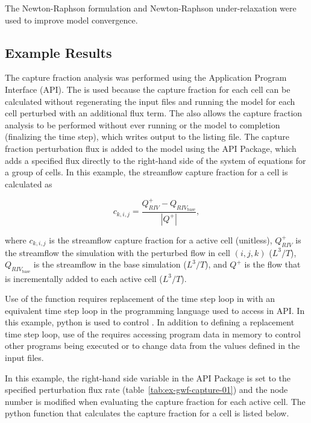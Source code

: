 The Newton-Raphson formulation and Newton-Raphson under-relaxation were used to improve model convergence.


\subsection{Example Results}

The capture fraction analysis was performed using the \MF Application Program Interface (API). The \mfapi is used because the capture fraction for each cell can be calculated without regenerating the input files and running the model for each cell perturbed with an additional flux term. The \mfapi also allows the capture fraction analysis to be performed without ever running or the model to completion (finalizing the time step), which writes output to the listing file. The capture fraction perturbation flux is added to the model using the API Package, which adds a specified flux directly to the right-hand side of the system of equations for a group of cells. In this example, the streamflow capture fraction for a cell is calculated as

\begin{equation}
	\label{eq:capture-fraction}
	c_{k,i,j} = \frac{Q_{RIV}^{+} - Q_{{RIV}_{\text{base}}}}{|Q^{+}|} ,
\end{equation}

\noindent where $c_{k,i,j}$ is the streamflow capture fraction for a active cell (unitless), $Q_{RIV}^{+}$ is the streamflow the simulation with the perturbed flow in cell $(i,j,k)$ ($L^3/T$), $Q_{{RIV}_{\text{base}}}$ is the streamflow in the base simulation ($L^3/T$), and $Q^{+}$ is the flow that is incrementally added to each active cell  ($L^3/T$).


Use of the \mfapi function requires replacement of the time step loop in \MF with an equivalent time step loop in the programming language used to access in API. In this example, python is used to control \MF. In addition to defining a replacement time step loop, use of the \mfapi requires accessing program data in memory to control other programs being executed or to change \MF data from the values defined in the \MF input files. 

In this example, the right-hand side variable in the API Package is set to the specified perturbation flux rate (table~\ref{tab:ex-gwf-capture-01}) and the node number is modified when evaluating the capture fraction for each active cell. The python function that calculates the capture fraction for a cell is listed below.

